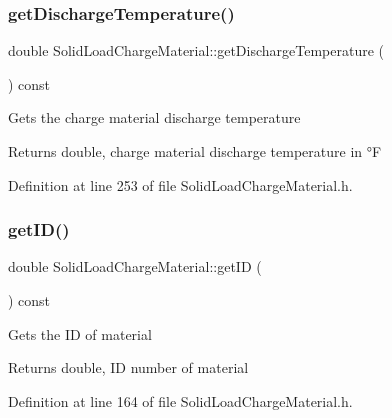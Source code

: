 \subsubsection{\texorpdfstring{get\+Discharge\+Temperature()}{getDischargeTemperature()}\hspace{0.1cm}{\footnotesize\ttfamily [3/3]}}
{\footnotesize\ttfamily double Solid\+Load\+Charge\+Material\+::get\+Discharge\+Temperature (\begin{DoxyParamCaption}{ }\end{DoxyParamCaption}) const\hspace{0.3cm}{\ttfamily [inline]}}

Gets the charge material discharge temperature \begin{DoxyReturn}{Returns}
double, charge material discharge temperature in °F 
\end{DoxyReturn}


Definition at line 253 of file Solid\+Load\+Charge\+Material.\+h.

\mbox{\label{class_solid_load_charge_material_ae34ce5c6f1f362340ead0748aaf885b8}} 
\subsubsection{\texorpdfstring{get\+I\+D()}{getID()}\hspace{0.1cm}{\footnotesize\ttfamily [1/3]}}
{\footnotesize\ttfamily double Solid\+Load\+Charge\+Material\+::get\+ID (\begin{DoxyParamCaption}{ }\end{DoxyParamCaption}) const\hspace{0.3cm}{\ttfamily [inline]}}

Gets the ID of material \begin{DoxyReturn}{Returns}
double, ID number of material 
\end{DoxyReturn}


Definition at line 164 of file Solid\+Load\+Charge\+Material.\+h.

\mbox{\label{class_solid_load_charge_material_ae34ce5c6f1f362340ead0748aaf885b8}} 
